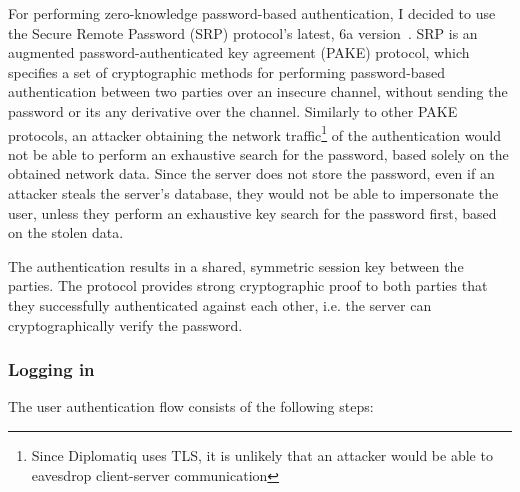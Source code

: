 For performing zero-knowledge password-based authentication, I decided to use the Secure Remote Password (SRP) protocol's latest, 6a version~\cite{rfc2945}. SRP is an augmented password-authenticated key agreement (PAKE) protocol, which specifies a set of cryptographic methods for performing password-based authentication between two parties over an insecure channel, without sending the password or its any derivative over the channel. Similarly to other PAKE protocols, an attacker obtaining the network traffic\footnote{Since Diplomatiq uses TLS, it is unlikely that an attacker would be able to eavesdrop client-server communication} of the authentication would not be able to perform an exhaustive search for the password, based solely on the obtained network data. Since the server does not store the password, even if an attacker steals the server's database, they would not be able to impersonate the user, unless they perform an exhaustive key search for the password first, based on the stolen data.

The authentication results in a shared, symmetric session key between the parties. The protocol provides strong cryptographic proof to both parties that they successfully authenticated against each other, i.e. the server can cryptographically verify the password.

\subsubsection{Logging in}

The user authentication flow consists of the following steps:

